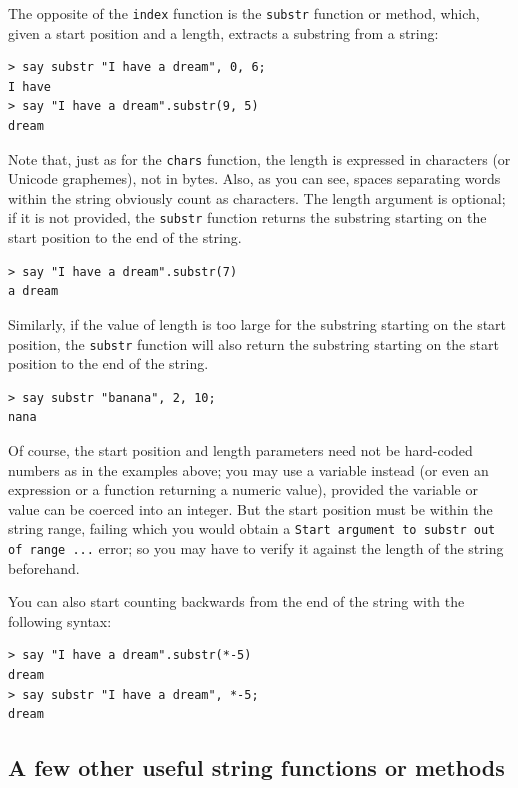 The opposite of the {\tt index} function is the {\tt substr} 
function or method, which, given a start position and a length, 
extracts a substring from a string:

\begin{verbatim}
> say substr "I have a dream", 0, 6;
I have
> say "I have a dream".substr(9, 5)
dream
\end{verbatim}
%

Note that, just as for the {\tt chars} function, the length 
is expressed in characters (or Unicode graphemes), not in bytes. 
Also, as you can see, spaces separating words within the string 
obviously count as characters. The length argument is optional; 
if it is not provided, the {\tt substr} function returns the 
substring starting on the start position to the end of the string. 

\begin{verbatim}
> say "I have a dream".substr(7)
a dream
\end{verbatim}

Similarly, if the value of length is too large for the 
substring starting on the start position, the {\tt substr} 
function will also return the substring starting on the start 
position to the end of the string.

\begin{verbatim}
> say substr "banana", 2, 10;
nana
\end{verbatim}

Of course, the start position and length parameters need not be 
hard-coded numbers as in the examples above; you may use a variable 
instead (or even an expression or a function returning a numeric 
value), provided the variable or value can be coerced into an integer. 
But the start position must be within the string range, 
failing which you would obtain a {\tt Start argument to 
substr out of range ...} error; so you may have to verify it 
against the length of the string beforehand. 

You can also start counting backwards from the end of the 
string with the following syntax:

\begin{verbatim}
> say "I have a dream".substr(*-5)
dream
> say substr "I have a dream", *-5;
dream
\end{verbatim}
%


\subsection{A few other useful string functions or methods}

